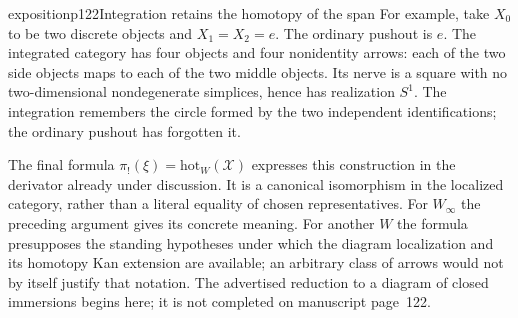 \begin{dcomment}{exposition}{p122}{Integration retains the homotopy of the span}
For example, take $X_0$ to be two discrete objects and $X_1=X_2=e$. The ordinary pushout is $e$. The integrated category has four objects and four nonidentity arrows: each of the two side objects maps to each of the two middle objects. Its nerve is a square with no two-dimensional nondegenerate simplices, hence has realization $S^1$. The integration remembers the circle formed by the two independent identifications; the ordinary pushout has forgotten it.

The final formula $\pi_!(\xi)=\mathrm{hot}_W(\mathscr X)$ expresses this construction in the derivator already under discussion. It is a canonical isomorphism in the localized category, rather than a literal equality of chosen representatives. For $W_\infty$ the preceding argument gives its concrete meaning. For another $W$ the formula presupposes the standing hypotheses under which the diagram localization and its homotopy Kan extension are available; an arbitrary class of arrows would not by itself justify that notation. The advertised reduction to a diagram of closed immersions begins here; it is not completed on manuscript page~122.
\end{dcomment}

